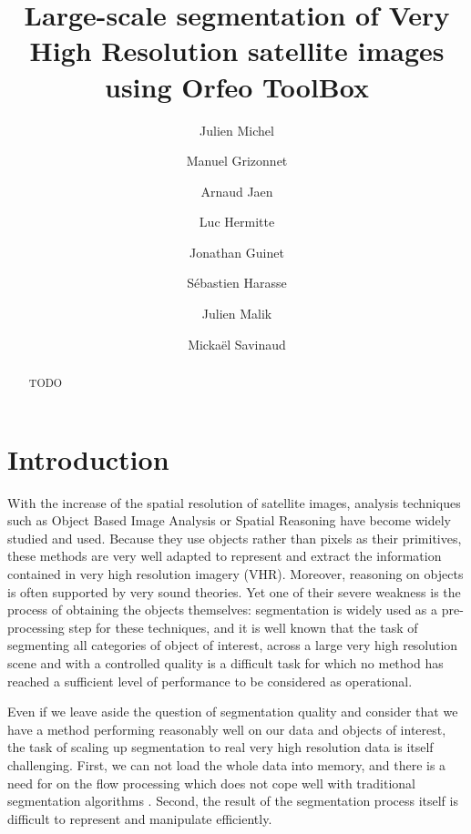 \documentclass{josis}
\begin{document}
\title{Large-scale segmentation of Very High Resolution satellite images using Orfeo ToolBox}

\author{Julien Michel}
\author{Manuel Grizonnet}
\author{Arnaud Jaen}
\author{Luc Hermitte}
\author{Jonathan Guinet}
\author{S\'ebastien Harasse}
\author{Julien Malik}
\author{Micka\"el Savinaud}


\maketitle


\begin{abstract}
TODO
\end{abstract}


\section{Introduction}

With the increase of the spatial resolution of satellite images,
analysis techniques such as Object Based Image Analysis or Spatial
Reasoning \cite{inglada2009qualitative} have become widely studied and
used. Because they use objects rather than pixels as their primitives,
these methods are very well adapted to represent and extract the
information contained in very high resolution imagery (VHR). Moreover,
reasoning on objects is often supported by very sound theories. Yet
one of their severe weakness is the process of obtaining the objects
themselves: segmentation is widely used as a pre-processing step for
these techniques, and it is well known that the task of segmenting all
categories of object of interest, across a large very high resolution
scene and with a controlled quality is a difficult task for which no
method has reached a sufficient level of performance to be considered
as operational.

Even if we leave aside the question of segmentation quality and
consider that we have a method performing reasonably well on our data
and objects of interest, the task of scaling up segmentation to real
very high resolution data is itself challenging. First, we can not
load the whole data into memory, and there is a need for on the flow
processing which does not cope well with traditional segmentation
algorithms \cite{shi2000normalized}. Second, the result of the
segmentation process itself is difficult to represent and manipulate
efficiently.
\end{document}
